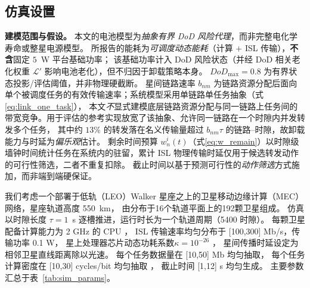 \documentclass[a4paper,11pt]{article}
\begin{document}
\subsection{仿真设置}
\label{subsec:sim_setup}

\noindent\textbf{建模范围与假设。}
本文的电池模型为\emph{抽象有界 DoD 风险代理}，而非完整电化学寿命或整星电源模型。
所报告的能耗为\emph{可调度动态能耗}（计算 $+$ ISL 传输），\textbf{不含}固定 $5$~W 平台基础功率；
该基础功率计入 DoD 风险状态（并经 DoD 相关老化权重 $\mathcal{L}'$ 影响电池老化），但不归因于卸载策略本身。
$DoD_{\max}=0.8$ 为有界状态投影/评估阈值，并非物理硬截断。
星间链路速率 $b_{nm}$ 为链路资源分配后面向单个被调度任务的有效传输速率；系统模型采用单链路单任务抽象（式\eqref{eq:link_one_task}），
本文\emph{不}显式建模底层链路资源分配与同一链路上任务间的带宽竞争。用于评估的参考实现放宽了该抽象、允许同一链路在一个时隙内并发转发多个任务，
其中约 $13\%$ 的转发落在名义传输量超过 $b_{nm}\tau$ 的链路--时隙，故卸载能力与时延为\emph{偏乐观}估计。
剩余时间预算 $w^i_n(t)$（式\eqref{eq:w_remain}）以时隙级墙钟时间统计任务在系统内的驻留，累计 ISL 物理传输时延仅用于候选转发动作的可行性筛选，二者不重复扣除。
截止时间以基于预测可行性的\emph{动作筛选}方式施加，而非端到端硬保证。


我们考虑一个部署于低轨（LEO）Walker 星座之上的卫星移动边缘计算（MEC）网络，星座轨道高度 550~km，
由分布于16个轨道平面上的192颗卫星组成。
仿真以时隙长度 $\tau=1$~s
逐槽推进，运行时长为一个轨道周期（5400 时隙）。
每颗卫星配备计算能力为 2 GHz 的 CPU \cite{zhang2024mhspo}，
ISL 传输速率均匀分布于 [100,300] Mb/s，传输功率 0.1 W，
星上处理器芯片动态功耗系数$\kappa=10^{-26}$ \cite{zhang2024mhspo}，
星间传播时延设定为相邻卫星直线距离除以光速。
每个任务数据量在 [10,50] Mb 均匀抽取，
每个任务计算密度在 [10,30] cycles/bit 均匀抽取 \cite{zhang2024mhspo}，
截止时间 [1,12] s 均匀生成。
主要参数汇总于表~\ref{tab:sim_params}。
\end{document}
